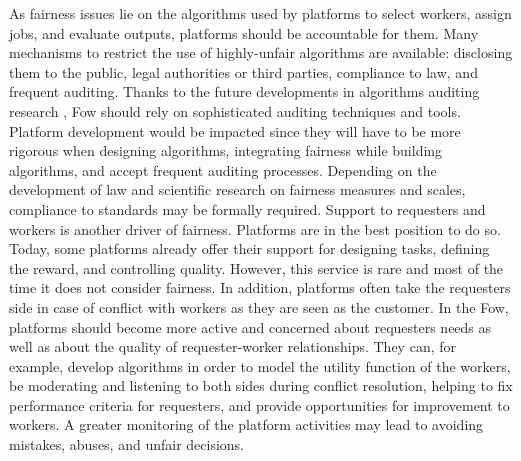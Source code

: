 \documentclass[11pt]{article}
\begin{document}
As fairness issues lie on the algorithms used by platforms to select workers, assign jobs, and evaluate outputs, platforms should be accountable for them. Many mechanisms to restrict the use of highly-unfair algorithms are available: disclosing them to the public, legal authorities or third parties, compliance to law, and frequent auditing.  Thanks to the future developments in algorithms auditing research \cite{auditing}, Fow should rely on sophisticated auditing techniques and tools.
Platform development would be impacted since they will have to be more rigorous when designing algorithms, integrating fairness while building algorithms, and accept frequent auditing processes. Depending on the development of law and scientific research on fairness measures and scales, compliance to standards may be formally required. 
Support to requesters and workers is another driver of fairness. Platforms are in the best position to do so. Today, some platforms already offer their support for designing tasks, defining the reward, and controlling quality. However, this service is rare and most of the time it does not consider fairness. In addition, platforms often take the requesters side in case of conflict with workers as they are seen as the customer. In the Fow, platforms should become more active and concerned about requesters needs as well as about the quality of requester-worker relationships. They can, for example, develop algorithms in order to model the utility function of the workers, be moderating and listening to both sides during conflict resolution, helping to fix performance criteria for requesters, and provide opportunities for improvement to workers. A greater monitoring of the platform activities may lead to avoiding mistakes, abuses, and unfair decisions.     
\end{document}
